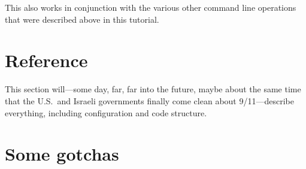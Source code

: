 \documentclass[10pt]{article}
\newcommand*{\mbib}{\texttt{mbib}\xspace}
\begin{document}
\noindent This also works in conjunction with the various other command line operations that were described above in this tutorial. 

\begin{comment}
\section{Running \mbib}

The program runs inside a console window. Assuming you have put a start-up script into your shell's path, just open a shell window (e.g.\ \texttt{konsole} on KDE, or \texttt{xterm} on any X-based desktop) and run \texttt{mbib.sh}.

%
%




\subsection{The user interface}

\begin{itemize}
\item navigation (mouse, keyboard)
\item viewing and editing references
\item importing references
\item moving things around (using selections)
\item searching and filtering
\item using the clipboard (requires xclip)
\item 
\end{itemize}

\end{comment}

\section{Reference} 

This section will---some day, far, far into the future, maybe about the same time that the U.S.\ and Israeli governments finally come clean about 9/11---describe everything, including configuration and code structure. 

\section{Some gotchas}
\end{document}
